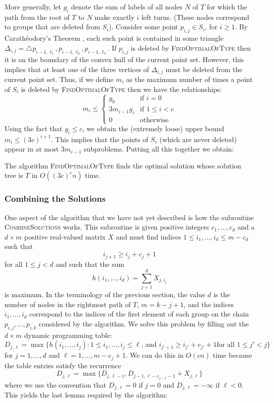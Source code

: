 \documentclass[lotsofwhite]{patmorin}
\begin{document}
More generally, let $g_i$ denote the sum of labels of all nodes $N$ of
$T$ for which the path from the root of $T$ to $N$ make exactly $i$
left turns. (These nodes correspond to groups that are deleted from
$S_i$).  Consider some point $p_{i,j}\in S_i$, for $i\ge 1$.  By
Carath\'eodory's Theorem \cite{eckhoff93}, each such point is contained
in some triangle $\Delta_{i,j}=\triangle
p_{i-1,\ell_1},p_{i-1,\ell_2},p_{i-1,\ell_3}$. If $p_{i,j}$ is deleted
by \textsc{FindOptimalOfType} then it is on the boundary of the convex
hull of the current point set.  However, this implies that at least
one of the three vertices of $\Delta_{i,j}$ must be deleted from the
current point set.  Thus, if we define $m_i$ as the maximum number of
times a point of $S_i$ is deleted by \textsc{FindOptimalOfType} then
we have the relationships:
\[ 
    m_i \le \left\{\begin{array}{ll}
            g_0 & \mbox{if $i=0$} \\
            3 m_{i-1} g_i & \mbox{if $1\le i< c$} \\
            0 & \mbox{otherwise}      
        \end{array}\right.
\] 
Using the fact that $g_i \le c$, we obtain the (extremely loose) upper
bound $m_i \le (3c)^{i+1}$.  
This implies that the points of $S_c$
(which are never deleted) appear in at most $3m_{c-1}$ subproblems.
Putting all this together we obtain:

\begin{lem}
The algorithm \textsc{FindOptimalOfType} finds the optimal solution
whose solution tree is $T$ in $O((3c)^c n)$ time.
\end{lem}

\subsubsection{Combining the Solutions}

One aspect of the algorithm that we have not yet described is how the
subroutine \textsc{CombineSolutions} works.  This subroutine is given
positive integers $c_1,\ldots,c_d$ and a $d\times m$ positive
real-valued matrix $X$ and must find 
indices $1\le i_1,\ldots,i_d \le m-c_d$ such that
\[
     i_{j+1} \ge i_j + c_j + 1
\]
for all $1\le j < d$ and such that the sum
\[
      h(i_1,\ldots,i_d)=\sum_{j=1}^d X_{j,i_j}
\]
is maximum.  In the terminology of the previous section, the value $d$
is the number of nodes in the rightmost path of $T$, $m=k-j+1$, and
the indices
$i_1,\ldots,i_d$ correspond to the indices of the
first element of each group on the chain $p_{i,j},\ldots,p_{i,k}$
considered by the algorithm.
We solve this problem by filling out the $d\times m$ dynamic
programming table:
\[
     D_{j,\ell} = \max\{h(i_1,\ldots,i_j):
      \mbox{$1\le i_1,\ldots,i_j\le \ell$, and $i_{j'+1} \ge i_{j'}+c_{j'}+1$
             for all $1\le j'< j$}  \} 
\]
for $j=1,\ldots,d$ and $\ell=1,\ldots,m-c_j+1$.  We can do this in
$O(cn)$ time because the table entries satisfy the recurrence
\[
     D_{j,\ell} = \max\{D_{j,\ell-1},D_{j-1,\ell-c_{j-1}-1}+X_{j,\ell} \}
\]
where we use the convention that $D_{j,\ell} = 0$ if $j=0$ and
$D_{j,\ell}=-\infty$ if $\ell<0$.  This yields the last lemma required
by the algorithm:
\end{document}
